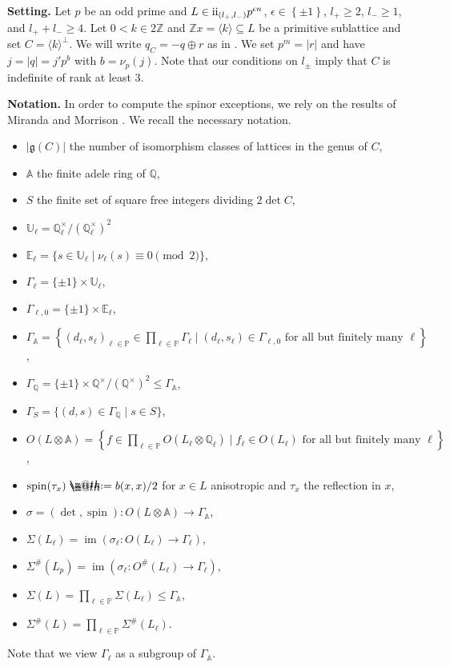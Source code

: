 \documentclass{amsart}
\makeatletter
\theoremstyle{definition}
\theoremstyle{plain}
\DeclareMathOperator{\spin}{spin}
\DeclareMathOperator{\im}{im}
\renewcommand{\AA}{\mathbb{A}}
\newcommand{\QQ}{\mathbb{Q}}
\newcommand{\ZZ}{\mathbb{Z}}
\newcommand{\PP}{\mathbb{P}}
\newcommand{\UU}{\mathbb{U}}
\newcommand{\EE}{\mathbb{E}}
\newcommand{\RN}[1]{\textup{\uppercase\expandafter{\romannumeral#1}}}
\newcommand{\even}{\RN{2}}
\newcommand*{\defeq}{\mathrel{\rlap{%
                     \raisebox{0.3ex}{$\m@th\cdot$}}%
                     \raisebox{-0.3ex}{$\m@th\cdot$}}%
                     =}
\makeatother
\begin{document}
\textbf{Setting.}
Let $p$ be an odd prime and $L \in \even_{(l_+,l_-)}p^{\epsilon n}$, $\epsilon \in \left\{\pm 1\right\}$, $l_+ \geq 2$, $l_-\geq 1$, and $l_+ + l_- \geq 4$. Let $0<k \in 2\ZZ$ and $\ZZ x=\langle k \rangle \subseteq L$ be a primitive sublattice and set $C = \langle k \rangle^\perp$.
We will write $q_C = -q \oplus r$ as in . We set $p^m = |r|$ and have $j=|q|=j' p^b$ with $b=\nu_p(j)$.
Note that our conditions on $l_\pm$ imply that $C$ is indefinite of rank at least $3$.

\textbf{Notation.}\hfill
In order to compute the spinor exceptions,
we rely on the results of Miranda and Morrison
\cite{miranda_morrison:embeddings}.
We recall the necessary notation.
\begin{itemize}
 \item $|\mathfrak{g}(C)|$ the number of isomorphism classes of lattices in the genus of $C$,
 \item $\AA$ the finite adele ring of $\QQ$,
 \item $S$ the finite set of square free integers dividing $2\det C$,
  \item $\UU_\ell= \QQ_\ell^\times / \left(\QQ_\ell^\times\right)^2$
 \item $\EE_\ell= \{s \in \UU_\ell \mid \nu_\ell(s) \equiv 0 \pmod 2\}$,
 \item $\Gamma_{\ell}=\{ \pm 1 \} \times \UU_\ell$,
 \item $\Gamma_{\ell,0}=\{\pm 1\} \times \EE_\ell$,
 \item $\Gamma_\AA=\left\{(d_\ell,s_\ell)_{\ell \in \PP} \in \prod_{\ell \in \PP}\Gamma_{\ell} \mid (d_\ell,s_\ell) \in \Gamma_{\ell,0} \mbox{ for all but finitely many  } \ell\right\}$,
 \item $\Gamma_\QQ= \{\pm 1\} \times \QQ^\times / \left(\QQ^\times\right)^2\leq \Gamma_\AA$,
 \item $\Gamma_S=\{(d,s) \in \Gamma_\QQ \mid s \in S\}$,
 \item $O(L\otimes \mathbb{A})=\left\{f \in \prod_{\ell \in \PP} O(L_\ell\otimes \QQ_\ell) \mid f_\ell \in O(L_\ell) \mbox{ for all but finitely many }\ell\right\}$,
 \item $\spin(\tau_x)\defeq b(x,x)/2$ for $x \in L$ anisotropic and $\tau_x$ the reflection in $x$,
 \item $\sigma = (\det,\spin)\colon O(L\otimes \mathbb{A})
 \rightarrow \Gamma_\AA$,
 \item $\Sigma(L_\ell) = \im(\sigma_\ell \colon O(L_\ell) \rightarrow \Gamma_\ell)$,
 \item $\Sigma^\#(L_p) = \im(\sigma_\ell \colon O^\#(L_\ell) \rightarrow \Gamma_\ell)$,
 \item $\Sigma(L) = \prod_{\ell \in \PP}\Sigma(L_\ell) \leq \Gamma_\AA$,
 \item $\Sigma^\#(L) = \prod_{\ell \in \PP}\Sigma^\#(L_\ell)$.
\end{itemize}
Note that we view $\Gamma_\ell$ as a subgroup of $\Gamma_\AA$.
\end{document}
